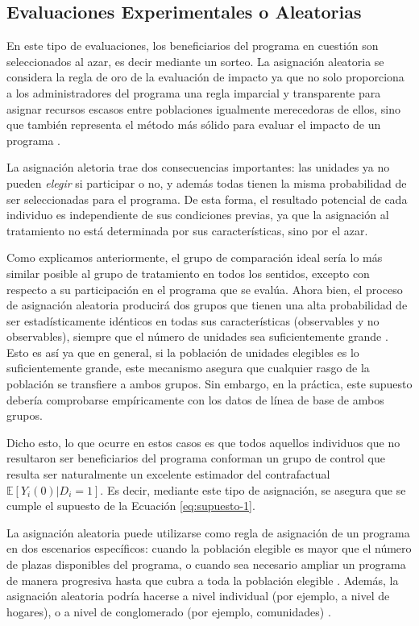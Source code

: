\documentclass[../../main.tex]{subfiles}
\begin{document}
\subsection{Evaluaciones Experimentales o Aleatorias}
En este tipo de evaluaciones, los beneficiarios del programa en cuestión son seleccionados
al azar, es decir mediante un sorteo. La asignación aleatoria se considera la regla de oro
de la evaluación de impacto ya que no solo proporciona a los administradores del programa
una regla imparcial y transparente para asignar recursos escasos entre poblaciones
igualmente merecedoras de ellos, sino que también representa el método más sólido para
evaluar el impacto de un programa \cite{gertler-2016}.

La asignación aletoria trae dos consecuencias importantes: las unidades ya no pueden
\textit{elegir} si participar o no, y además todas tienen la misma probabilidad de ser
seleccionadas para el programa. De esta forma, el resultado potencial de cada individuo es
independiente de sus condiciones previas, ya que la asignación al tratamiento no está
determinada por sus características, sino por el azar.

Como explicamos anteriormente, el grupo de comparación ideal sería lo más similar posible
al grupo de tratamiento en todos los sentidos, excepto con respecto a su participación en
el programa que se evalúa. Ahora bien, el proceso de asignación aleatoria producirá dos
grupos que tienen una alta probabilidad de ser estadísticamente idénticos en todas sus
características (observables y no observables), siempre que el número de unidades sea
suficientemente grande \cite{gertler-2016}. Esto es así ya que en general, si la población
de unidades elegibles es lo suficientemente grande, este mecanismo asegura que cualquier
rasgo de la población se transfiere a ambos grupos. Sin embargo, en la práctica, este
supuesto debería comprobarse empíricamente con los datos de línea de base de ambos grupos.

Dicho esto, lo que ocurre en estos casos es que todos aquellos individuos que no
resultaron ser beneficiarios del programa conforman un grupo de control que resulta ser
naturalmente un excelente estimador del contrafactual \(\mathbb{E}
\left[Y_i(0)|D_i=1\right]\). Es decir, mediante este tipo de asignación, se asegura que se
cumple el supuesto de la Ecuación \ref{eq:supuesto-1}.

La asignación aleatoria puede utilizarse como regla de asignación de un programa en dos
escenarios específicos: cuando la población elegible es mayor que el número de plazas
disponibles del programa, o  cuando sea necesario ampliar un programa de manera progresiva
hasta que cubra a toda la población elegible \cite{gertler-2016}. Además, la asignación
aleatoria podría hacerse a nivel individual (por ejemplo, a nivel de hogares), o a nivel
de conglomerado (por ejemplo, comunidades) \cite{bernal}.
\end{document}
